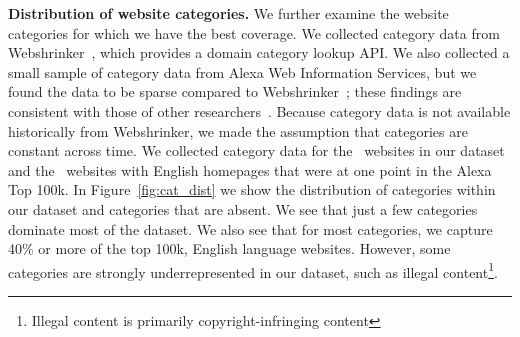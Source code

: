 {\textbf{Distribution of website categories.}}
We further examine the website categories for which we have the best coverage. We collected category data from Webshrinker~\cite{Webshrinker}, which provides a domain category lookup API.
We also collected a small sample of category data from Alexa Web Information Services, but we found the data to be sparse compared to Webshrinker~\cite{awis}; these findings are consistent with those of other researchers~\cite{mathur2019dark}.
Because category data is not available historically from Webshrinker, we made the assumption that categories are constant across time. We collected category data for the \numpresentdoms~websites in our dataset and the \numabsentenglishdoms~websites with English homepages that were at one point in the Alexa Top 100k.
In Figure~\ref{fig:cat_dist} we show the distribution of categories within our dataset and categories that are absent. We see that just a few categories dominate most of the dataset. We also see that for most categories, we capture 40\% or more of the top 100k, English language websites.
However, some categories are strongly underrepresented in our dataset, such as illegal content\footnote{Illegal content is primarily copyright-infringing content}.

